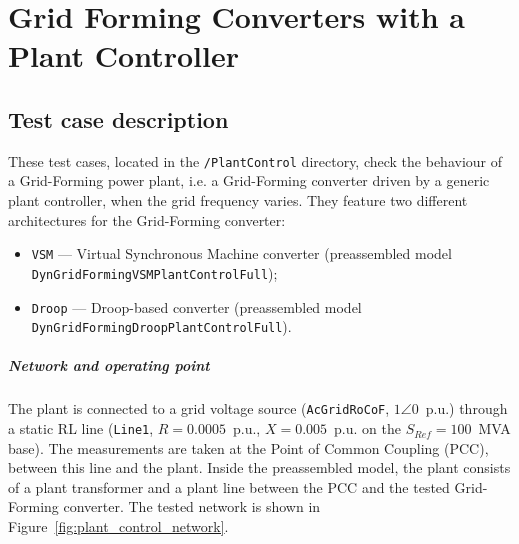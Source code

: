 \documentclass[a4paper, 12pt]{report}
\begin{document}
\chapter*{Grid Forming Converters with a Plant Controller}
\section*{Test case description}
These test cases, located in the \texttt{/PlantControl} directory, check the behaviour of a Grid-Forming power plant, i.e. a Grid-Forming converter driven by a generic plant controller, when the grid frequency varies.
They feature two different architectures for the Grid-Forming converter:
\begin{itemize}
\item \texttt{VSM} --- Virtual Synchronous Machine converter (preassembled model \texttt{DynGridFormingVSM\allowbreak PlantControlFull});
\item \texttt{Droop} --- Droop-based converter (preassembled model \texttt{DynGridFormingDroop\allowbreak PlantControlFull}).
\end{itemize}

\paragraph{Network and operating point}
The plant is connected to a grid voltage source (\texttt{AcGridRoCoF}, $1\angle 0$~p.u.) through a static RL line (\texttt{Line1}, $R = 0.0005$~p.u., $X = 0.005$~p.u. on the $S_{Ref} = 100$~MVA base). The measurements are taken at the Point of Common Coupling (PCC), between this line and the plant. Inside the preassembled model, the plant consists of a plant transformer and a plant line between the PCC and the tested Grid-Forming converter. The tested network is shown in Figure~\ref{fig:plant_control_network}.
\end{document}
